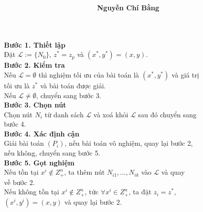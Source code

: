 \documentclass{beamer}
\title[]{\fontsize{13pt}{10pt}\selectfont {\bf \LARGE Phương pháp nhánh cận}\\}
\author[]{\bf Nguyễn Chí Bằng \\}
\begin{document}
\begin{frame}
\small
\setlength{\parindent}{4em}
\noindent \textbf{Bước 1. Thiết lập} \\
Đặt $\mathcal{L}:=\{N_0 \}$, $z^*=z_p$ và $(x^*,y^*)=(x,y)$. \\
\noindent \textbf{Bước 2. Kiểm tra} \\
Nếu $\mathcal{L} = \emptyset$ thì nghiệm tối ưu của bài toán là $(x^*,y^*)$ và giá trị \\ tối ưu là $z^*$ và bài toán được giải. \\
Nếu $\mathcal{L} \neq \emptyset$, chuyển sang bước 3. \\ 
\noindent \textbf{Bước 3. Chọn nút} \\
Chọn nút $N_i$ từ danh sách $\mathcal{L}$ và xoá khỏi $\mathcal{L}$ sau đó chuyển sang \\ bước 4. \\ 
\noindent \textbf{Bước 4. Xác định cận} \\ 
Giải bài toán $(P_i)$, nếu bài toán vô nghiệm, quay lại bước 2, \\ nếu không, chuyển sang bước 5. \\ 
\noindent \textbf{Bước 5. Gọt nghiệm} \\
Nếu tồn tại $x^i \notin Z^n_+$, ta thêm nút $N_{i1}, \ldots , N_{ik}$ vào $\mathcal{L}$ và quay \\ về bước 2. \\
Nếu không tồn tại $x^i \notin Z^n_+$, tức $\forall x^i \in Z^n_+$, ta đặt $z_i = z^*$, \\ $(x^i,y^i) = (x,y)$ và quay lại bước 2.
\end{frame}    
\end{document}
